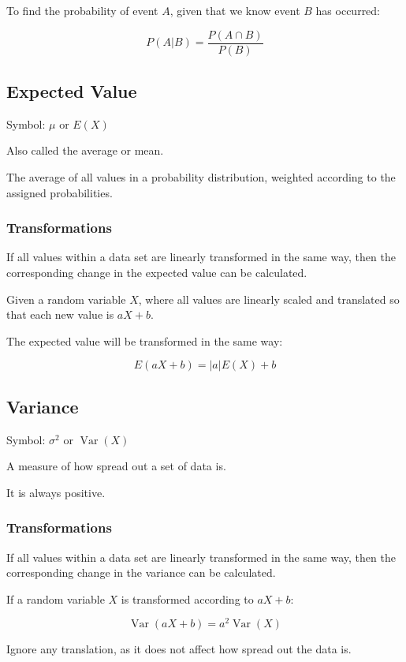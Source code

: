 \documentclass[a4paper,11pt]{article}
\DeclareMathOperator\Var{Var}
\begin{document}
To find the probability of event $A$, given that we know event $B$ has occurred:

$$
P(A|B) = \frac{P(A \cap B)}{P(B)}
$$


\subsection{Expected Value}

Symbol: $\mu$ or $E(X)$

Also called the average or mean.

The average of all values in a probability distribution, weighted according to
the assigned probabilities.


\subsubsection{Transformations}

If all values within a data set are linearly transformed in the same way, then
the corresponding change in the expected value can be calculated.

Given a random variable $X$, where all values are linearly scaled and translated
so that each new value is $aX + b$.

The expected value will be transformed in the same way:

$$
E(aX + b) = |a| E(X) + b
$$


\subsection{Variance}

Symbol: $\sigma^2$ or $\Var(X)$

A measure of how spread out a set of data is.

It is always positive.


\subsubsection{Transformations}

If all values within a data set are linearly transformed in the same way, then
the corresponding change in the variance can be calculated.

If a random variable $X$ is transformed according to $aX + b$:

$$
\Var(aX + b) = a^2 \Var(X)
$$

Ignore any translation, as it does not affect how spread out the data is.
\end{document}
